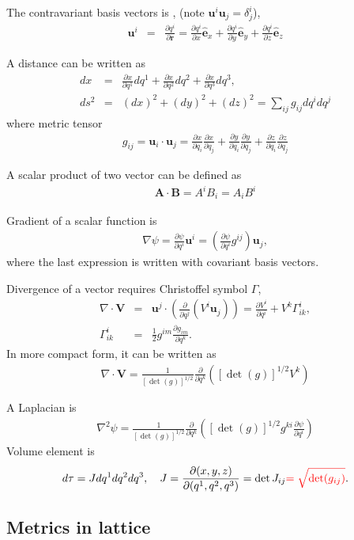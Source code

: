 \documentclass[10pt]{book}
\def\bm{\boldsymbol}
\newcommand{\bea}{\begin{eqnarray}}
\newcommand{\eea}{\end{eqnarray}}
\newcommand{\no}{\nonumber \\}
\newcommand{\del}{\partial}
\def\vr{{\bm r}}
\begin{document}
The contravariant basis vectors is , (note ${\bm u}^i {\bm u}_j=\delta^i_j$),
\bea 
{\bm u}^i&=&\frac{\del q^i}{\del \vr}=
\frac{\del q^i}{\del x}\hat{\bm e}_x +\frac{\del q^i}{\del y}\hat{\bm e}_y
+\frac{\del q^i}{\del z}\hat{\bm e}_z
\eea 

A distance can be written as
\bea 
dx&=&\frac{\del x}{\del q^1}dq^1+\frac{\del x}{\del q^2}dq^2+\frac{\del x}{\del q^3}dq^3, \no 
ds^2&=&(dx)^2+(dy)^2+(dz)^2=\sum_{ij} g_{ij}dq^i dq^j  
\eea 
where metric tensor
\bea 
g_{ij}={\bm u}_i\cdot {\bm u}_j=\frac{\del x}{\del q_i}\frac{\del x}{\del q_j}
+ \frac{\del y}{\del q_i}\frac{\del y}{\del q_j}
+ \frac{\del z}{\del q_i}\frac{\del z}{\del q_j}
\eea 

A scalar product of two vector can be defined as
\bea 
{\bm A}\cdot{\bm B}=A^i B_i=A_i B^i
\eea 

Gradient of a scalar function is
\bea 
\nabla \psi= \frac{\del \psi}{\del q^i} {\bm u}^i 
=\left( \frac{\del \psi}{\del q^i} g^{ij} \right) {\bm u}_j ,
\eea
where the last expression is written with covariant basis vectors.

Divergence of a vector requires Christoffel symbol $\Gamma$,
\bea 
\nabla\cdot{\bm V}&=& {\bm u}^j \cdot(\frac{\del}{\del q^j} (V^i {\bm u}_j)   )
=\frac{\del  V^i}{\del q^i}+V^k \Gamma^i_{i k},\no 
\Gamma^i_{ik}&=&\frac{1}{2}g^{im}\frac{\del g_{im}}{\del q^k}.                 
\eea 
In more compact form, it can be written as 
\bea 
\nabla\cdot{\bm V}=\frac{1}{[\det(g)]^{1/2}} \frac{\del}{\del q^k}\left(  [\det(g)]^{1/2} V^k \right) 
\eea  

A Laplacian is
\bea 
\nabla^2 \psi = \frac{1}{[\det(g)]^{1/2}} \frac{\del}{\del q^k}
\left( [\det(g)]^{1/2} g^{ki}\frac{\del\psi}{\del q^i}\right) 
\eea 
Volume element is
\bea 
d\tau= J d q^1 dq^2 dq^3, \quad J=\frac{\del(x,y,z)}{\del(q^1,q^2,q^3)}=\det{J_{ij}}
{\color{red}=\sqrt{\det(g_{ij})}}.
\eea 

\subsection{Metrics in lattice}
\end{document}
